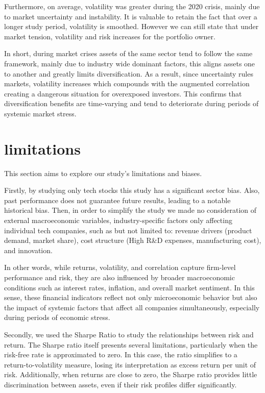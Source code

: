 \documentclass{article}
\begin{document}
\vspace{0.3cm}
Furthermore, on average, volatility was greater during the 2020 crisis, mainly due to market uncertainty and instability. It is valuable to retain the fact that over a longer study period, volatility is smoothed. However we can still state that under market tension, volatility and risk increases for the portfolio owner.

\vspace{0.3cm}
In short, during market crises assets of the same sector tend to follow the same framework, mainly due to industry wide dominant factors, this aligns assets one to another and greatly limits diversification. As a result, since uncertainty rules markets, volatility increases which compounds with the augmented correlation creating a dangerous situation for overexposed investors. This confirms that diversification benefits are time-varying and tend to deteriorate during periods of systemic market stress.


\section{limitations}

This section aims to explore our study's limitations and biases.
\vspace{0.3cm}

Firstly, by studying only tech stocks this study has a significant sector bias. Also, past performance does not guarantee future results, leading to a notable historical bias. Then, in order to simplify the study we made no consideration of external macroeconomic variables, industry-specific factors only affecting individual tech companies, such as but not limited to: revenue drivers (product demand, market share),  cost structure (High R\&D expenses, manufacturing cost), and innovation. 

\vspace{0.3cm}
In other words, while returns, volatility, and correlation capture firm-level performance and risk, they are also influenced by broader macroeconomic conditions such as interest rates, inflation, and overall market sentiment. In this sense, these financial indicators reflect not only microeconomic behavior but also the impact of systemic factors that affect all companies simultaneously, especially during periods of economic stress.

\vspace{0.3cm}
Secondly, we used the Sharpe Ratio to study the relationships between risk and return. The Sharpe ratio itself presents several limitations, particularly when the risk-free rate is approximated to zero. In this case, the ratio simplifies to a return-to-volatility measure, losing its interpretation as excess return per unit of risk. Additionally, when returns are close to zero, the Sharpe ratio provides little discrimination between assets, even if their risk profiles differ significantly.
\end{document}
